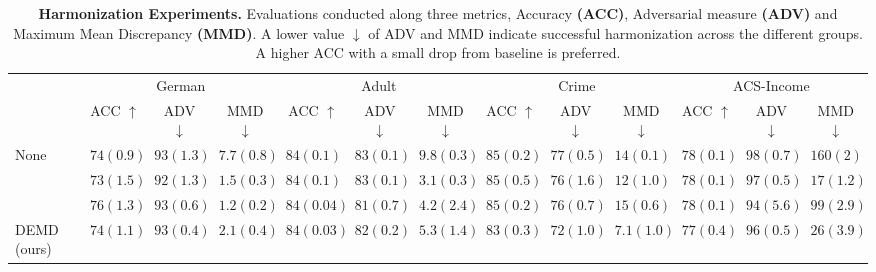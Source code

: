 \begin{table}[!t] 
	\scriptsize
	\setlength\tabcolsep{2.25pt} %
	\caption{\footnotesize \textbf{Harmonization Experiments.} Evaluations conducted along three metrics, Accuracy \textbf{(ACC)}, Adversarial measure \textbf{(ADV)} and Maximum Mean Discrepancy \textbf{(MMD)}. A lower value $\downarrow$ of ADV and MMD indicate successful harmonization across the different groups. A higher ACC with a small drop from baseline is preferred. }
	\vspace{-10pt}
	\begin{tabular*}{\linewidth}{l *{3}{c}|*{3}{c}|*{3}{c}|*{3}{c}}
		\midrule%
		& \multicolumn{3}{c}{German} & \multicolumn{3}{c}{Adult} & \multicolumn{3}{c}{Crime}& \multicolumn{3}{c}{ACS-Income} \\
		\cmidrule{2-4} \cmidrule{5-7} \cmidrule{8-10} \cmidrule{11-13}
		& ACC $\uparrow$ & ADV $\downarrow$ & MMD $\downarrow$ & ACC $\uparrow$ & ADV $\downarrow$ & MMD $\downarrow$ & ACC $\uparrow$ & ADV $\downarrow$ & MMD $\downarrow$ & ACC $\uparrow$ & ADV $\downarrow$  & MMD $\downarrow$ \\ 
		\midrule
		None & $74\scriptscriptstyle(0.9)$ & $93\scriptscriptstyle(1.3)$ & $7.7\scriptscriptstyle(0.8)$ & $84\scriptscriptstyle(0.1)$ & $83\scriptscriptstyle(0.1)$ & $9.8\scriptscriptstyle(0.3)$ & $85\scriptscriptstyle(0.2)$ & $77\scriptscriptstyle(0.5)$ & $14\scriptscriptstyle(0.1)$ & $78\scriptscriptstyle(0.1)$ & $98\scriptscriptstyle(0.7)$ & $160\scriptscriptstyle(2)$ \\
		\cite{zemel} & $73\scriptscriptstyle(1.5)$ & $92\scriptscriptstyle(1.3)$ & $1.5\scriptscriptstyle(0.3)$ & $84\scriptscriptstyle(0.1)$ & $83\scriptscriptstyle(0.1)$ & $3.1\scriptscriptstyle(0.3)$ & $85\scriptscriptstyle(0.5)$ & $76\scriptscriptstyle(1.6)$ & $12\scriptscriptstyle(1.0)$ & $78\scriptscriptstyle(0.1)$ & $97\scriptscriptstyle(0.5)$ & $17\scriptscriptstyle(1.2)$ \\
		\cite{cai} & $76\scriptscriptstyle(1.3)$ & $93\scriptscriptstyle(0.6)$ & $1.2\scriptscriptstyle(0.2)$ & $84\scriptscriptstyle(0.04)$ & $81\scriptscriptstyle(0.7)$ & $4.2\scriptscriptstyle(2.4)$ & $85\scriptscriptstyle(0.2)$ & $76\scriptscriptstyle(0.7)$ & $15\scriptscriptstyle(0.6)$ & $78\scriptscriptstyle(0.1)$ & $94\scriptscriptstyle(5.6)$ & $99\scriptscriptstyle(2.9)$ \\
		DEMD (ours) & $74\scriptscriptstyle(1.1)$ & $93\scriptscriptstyle(0.4)$ & $2.1\scriptscriptstyle(0.4)$ & $84\scriptscriptstyle(0.03)$ & $82\scriptscriptstyle(0.2)$ & $5.3\scriptscriptstyle(1.4)$ & $83\scriptscriptstyle(0.3)$ & $72\scriptscriptstyle(1.0)$ & $7.1\scriptscriptstyle(1.0)$ & $77\scriptscriptstyle(0.4)$ & $96\scriptscriptstyle(0.5)$ & $26\scriptscriptstyle(3.9)$ \\
		\midrule
	\end{tabular*}
	\label{tab:harm_results}
\end{table} 

